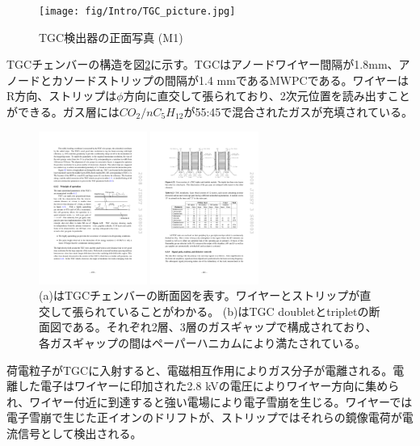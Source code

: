 \begin{figure} 
\centering
\texttt{[image: fig/Intro/TGC\_picture.jpg]}
\caption[TGC検出器]{TGC検出器の正面写真 (M1)\cite{cern_document_server}}
\label{TGC_picture}
\end{figure}

TGCチェンバーの構造を図\ref{TGC_structure}に示す。TGCはアノードワイヤー間隔が1.8mm、アノードとカソードストリップの間隔が1.4 mmであるMWPCである。ワイヤーはR方向、ストリップは$\phi$方向に直交して張られており、2次元位置を読み出すことができる。ガス層には$CO_2/nC_5H_{12}$が55:45で混合されたガスが充填されている。

\begin{figure}
\begin{minipage}[b]{.5\linewidth}
\centering
\includegraphics[height=5cm]{fig/Intro/TGC_structure.pdf}
\end{minipage}%
\begin{minipage}[b]{.5\linewidth}
\centering
\includegraphics[height=5cm]{fig/Intro/TGC_crosssection.pdf}
\end{minipage}%
\caption[TGCチェンバーの断面図]{ (a)はTGCチェンバーの断面図を表す\cite{JINST:2008}。ワイヤーとストリップが直交して張られていることがわかる。 (b)はTGC doubletとtripletの断面図である。それぞれ2層、3層のガスギャップで構成されており、各ガスギャップの間はペーパーハニカムにより満たされている。}
\label{TGC_structure}
\end{figure}


荷電粒子がTGCに入射すると、電磁相互作用によりガス分子が電離される。電離した電子はワイヤーに印加された2.8 kVの電圧によりワイヤー方向に集められ、ワイヤー付近に到達すると強い電場により電子雪崩を生じる。ワイヤーでは電子雪崩で生じた正イオンのドリフトが、ストリップではそれらの鏡像電荷が電流信号として検出される。

